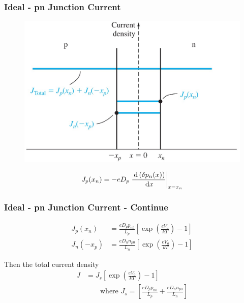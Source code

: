 \documentclass{beamer}
\begin{document}
    \begin{frame} \frametitle{Ideal - pn Junction Current}
        \begin{figure}[H]
            \centering
            \includegraphics[width=0.6\linewidth]{Current-density.jpg}
            \label{fig:Current-density.jpg}
        \end{figure}
        \begin{equation*}
            J_p(x_n) = - e D_p \left. \frac{\: \mathrm{d} \left( \delta p_n(x) \right)}{\: \mathrm{d} x} \right|_{x = x_n}
        \end{equation*}
    \end{frame}
    \begin{frame} \frametitle{Ideal - pn Junction Current - Continue}
        \begin{equation*}
            \begin{aligned}
                J_{p} (x_n) &= \frac{e D_p p_{n0}}{L_p} \left[ \exp\left( \frac{eV_a}{kT}  \right) - 1 \right] \\
                J_{n} (-x_p) &= \frac{eD_n n_{p0} }{L_n} \left[ \exp\left( \frac{eV_a}{kT}  \right) - 1 \right]
            \end{aligned}
        \end{equation*}
        \par Then the total current density
        \begin{equation*}
            \boxed{
                \begin{aligned}
                    J &= J_s \left[ \exp\left( \frac{eV_a}{kT}  \right) - 1 \right] \\
                    & \qquad  \text{where } J_s = \left[ \frac{eD_p p_{n0} }{L_p} + \frac{eD_n n_{p0} }{L_n}  \right]
                \end{aligned}
            }
        \end{equation*}
    \end{frame}
\end{document}
